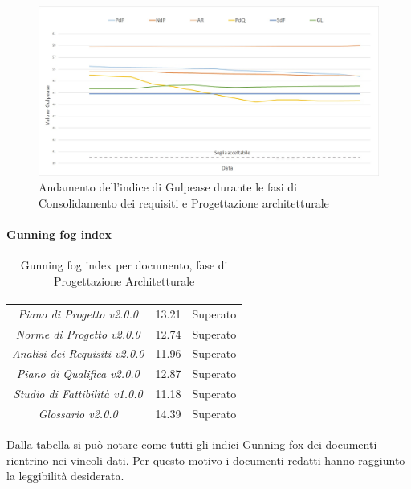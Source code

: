 \begin{figure} [H]
	\centering
	\includegraphics[scale=0.55]{Img/and_gulp_rp}
	\caption{Andamento dell'indice di Gulpease durante le fasi di Consolidamento dei requisiti e Progettazione architetturale}\label{immagine:gulpease rp}
\end{figure}

\pagebreak

\paragraph{Gunning fog index} \Spazio
\renewcommand{\arraystretch}{1.5}
\begin{table}[H]
	\begin{center}
		\begin{tabular}{|c|c|c|}
			\hline
			\rowcolor{title_row}
			\textbf{\color{title_text}{Documento}} & \textbf{\color{title_text}{Valore indice}} & \textbf{\color{title_text}{Esito}} \\
			\hline
			\emph{Piano di Progetto v2.0.0} & {13.21} & {Superato}\\
			\hline
			\emph{Norme di Progetto v2.0.0} & {12.74} & {Superato}\\
			\hline
			\emph{Analisi dei Requisiti v2.0.0} & {11.96} & {Superato}\\
			\hline
			\emph{Piano di Qualifica v2.0.0} & {12.87} & {Superato}\\
			\hline
			\emph{Studio di Fattibilità v1.0.0} & {11.18} & {Superato}\\
			\hline
			\emph{Glossario v2.0.0} & {14.39} & {Superato}\\
			\hline
		\end{tabular}
		\caption[Esiti verifica documenti, Consolidamento e Progettazione Architetturale]{Gunning fog index per documento, fase di Progettazione Architetturale}
		\label{tabella:verifica documenti gf}
	\end{center}
\end{table}
Dalla tabella si può notare come tutti gli indici Gunning fox dei documenti rientrino nei vincoli dati. Per questo motivo i documenti redatti hanno raggiunto la leggibilità desiderata.


